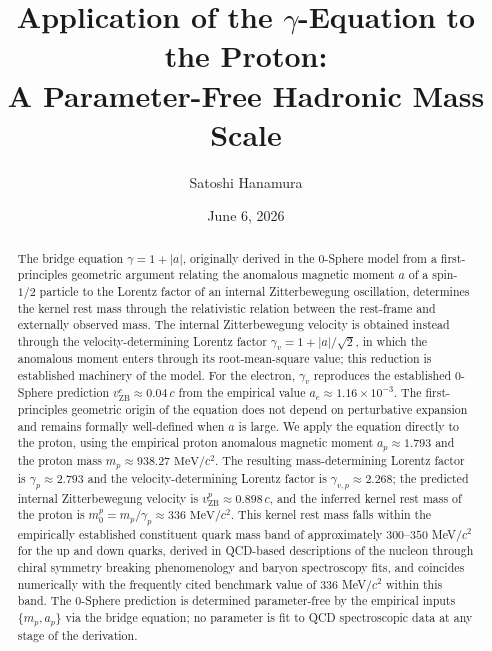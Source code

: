 \documentclass[%
 reprint, amsmath,amssymb, aps, prc, ]{revtex4-2}
\numberwithin{equation}{section}
\newcommand{\vZB}{v_{\text{ZB}}}
\begin{document}
\title{Application of the $\gamma$-Equation to the Proton:\\
A Parameter-Free Hadronic Mass Scale}

\author{Satoshi Hanamura}
\date{June 6, 2026}

\begin{abstract}
The bridge equation $\gamma = 1 + |a|$, originally derived in the 0-Sphere model from a first-principles geometric argument relating the anomalous magnetic moment $a$ of a spin-$1/2$ particle to the Lorentz factor of an internal Zitterbewegung oscillation, determines the kernel rest mass through the relativistic relation between the rest-frame and externally observed mass.
The internal Zitterbewegung velocity is obtained instead through the velocity-determining Lorentz factor $\gamma_v = 1 + |a|/\sqrt{2}$, in which the anomalous moment enters through its root-mean-square value; this reduction is established machinery of the model.
For the electron, $\gamma_v$ reproduces the established 0-Sphere prediction $\vZB^e \approx 0.04\,c$ from the empirical value $a_e \approx 1.16 \times 10^{-3}$.
The first-principles geometric origin of the equation does not depend on perturbative expansion and remains formally well-defined when $a$ is large.
We apply the equation directly to the proton, using the empirical proton anomalous magnetic moment $a_p \approx 1.793$ and the proton mass $m_p \approx 938.27 \text{ MeV}/c^2$.
The resulting mass-determining Lorentz factor is $\gamma_p \approx 2.793$ and the velocity-determining Lorentz factor is $\gamma_{v,p} \approx 2.268$; the predicted internal Zitterbewegung velocity is $\vZB^p \approx 0.898\,c$, and the inferred kernel rest mass of the proton is $m_{0}^{p} = m_p / \gamma_p \approx 336 \text{ MeV}/c^2$.
This kernel rest mass falls within the empirically established constituent quark mass band of approximately $300\text{--}350$ MeV$/c^2$ for the up and down quarks, derived in QCD-based descriptions of the nucleon through chiral symmetry breaking phenomenology and baryon spectroscopy fits, and coincides numerically with the frequently cited benchmark value of $336$ MeV$/c^2$ within this band.
The 0-Sphere prediction is determined parameter-free by the empirical inputs $\{m_p, a_p\}$ via the bridge equation; no parameter is fit to QCD spectroscopic data at any stage of the derivation.

\end{abstract}
\end{document}
